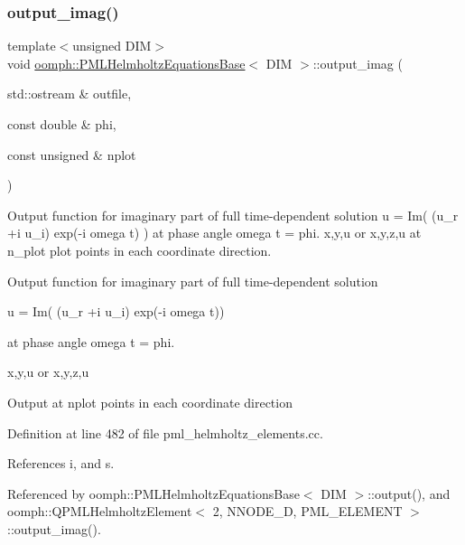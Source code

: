 \mbox{\label{classoomph_1_1PMLHelmholtzEquationsBase_a10e17c59371c3c3f1e7a1001837838ce}} 
\subsubsection{\texorpdfstring{output\+\_\+imag()}{output\_imag()}}
{\footnotesize\ttfamily template$<$unsigned D\+IM$>$ \\
void \hyperlink{classoomph_1_1PMLHelmholtzEquationsBase}{oomph\+::\+P\+M\+L\+Helmholtz\+Equations\+Base}$<$ D\+IM $>$\+::output\+\_\+imag (\begin{DoxyParamCaption}\item[{std\+::ostream \&}]{outfile,  }\item[{const double \&}]{phi,  }\item[{const unsigned \&}]{nplot }\end{DoxyParamCaption})}



Output function for imaginary part of full time-\/dependent solution u = Im( (u\+\_\+r +i u\+\_\+i) exp(-\/i omega t) ) at phase angle omega t = phi. x,y,u or x,y,z,u at n\+\_\+plot plot points in each coordinate direction. 

Output function for imaginary part of full time-\/dependent solution

u = Im( (u\+\_\+r +i u\+\_\+i) exp(-\/i omega t))

at phase angle omega t = phi.

x,y,u or x,y,z,u

Output at nplot points in each coordinate direction 

Definition at line 482 of file pml\+\_\+helmholtz\+\_\+elements.\+cc.



References i, and s.



Referenced by oomph\+::\+P\+M\+L\+Helmholtz\+Equations\+Base$<$ D\+I\+M $>$\+::output(), and oomph\+::\+Q\+P\+M\+L\+Helmholtz\+Element$<$ 2, N\+N\+O\+D\+E\+\_\+D, P\+M\+L\+\_\+\+E\+L\+E\+M\+E\+N\+T $>$\+::output\+\_\+imag().

\mbox{\label{classoomph_1_1PMLHelmholtzEquationsBase_a87bf6ae358dbcf6614b97e8e92810ef3}} 
